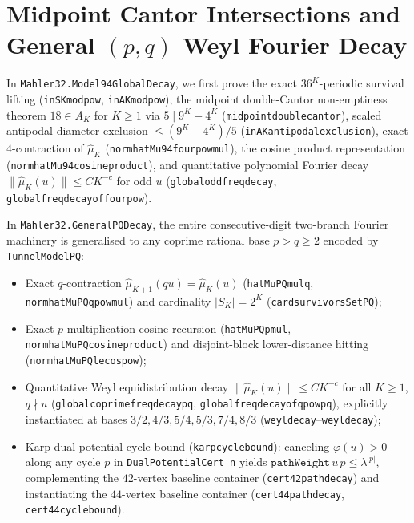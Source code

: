 \documentclass[11pt,a4paper]{article}
\theoremstyle{remark}
\renewcommand{\_}{\textunderscore\allowbreak}
\newcommand{\lean}[1]{\texttt{#1}}
\begin{document}
\section{Midpoint Cantor Intersections and General \texorpdfstring{$(p,q)$}{(p,q)} Weyl Fourier Decay}
\label{sec:pqdecay}

In \lean{Mahler32.\allowbreak Model94GlobalDecay}, we first prove the exact $36^K$-periodic survival lifting (\lean{inSK\_mod\_36\_pow}, \lean{inAK\_mod\_36\_pow}), the midpoint double-Cantor non-emptiness theorem $18\in A_K$ for $K\ge 1$ via $5\mid 9^K-4^K$ (\lean{midpoint\_double\_cantor}), scaled antipodal diameter exclusion $\le (9^K-4^K)/5$ (\lean{inAK\_antipodal\_exclusion}), exact $4$-contraction of $\hat\mu_K$ (\lean{norm\_hatMu94\_four\_pow\_mul}), the cosine product representation (\lean{norm\_hatMu94\_cosine\_product}), and quantitative polynomial Fourier decay $\|\hat\mu_K(u)\|\le C K^{-c}$ for odd $u$ (\lean{global\_odd\_freq\_decay}, \lean{global\_freq\_decay\_of\_four\_pow}).

In \lean{Mahler32.\allowbreak GeneralPQDecay}, the entire consecutive-digit two-branch Fourier machinery is generalised to any coprime rational base $p>q\ge 2$ encoded by \lean{TunnelModelPQ}:
\begin{itemize}[leftmargin=1.4em]
  \item Exact $q$-contraction $\hat\mu_{K+1}(q u)=\hat\mu_K(u)$ (\lean{hatMuPQ\_mul\_q}, \lean{norm\_hatMuPQ\_q\_pow\_mul}) and cardinality $|S_K|=2^K$ (\lean{card\_survivorsSetPQ});
  \item Exact $p$-multiplication cosine recursion (\lean{hatMuPQ\_p\_mul}, \lean{norm\_hatMuPQ\_cosine\_product}) and disjoint-block lower-distance hitting (\lean{norm\_hatMuPQ\_le\_cos\_pow});
  \item Quantitative Weyl equidistribution decay $\|\hat\mu_K(u)\|\le C K^{-c}$ for all $K\ge 1$, $q\nmid u$ (\lean{global\_coprime\_freq\_decay\_pq}, \lean{global\_freq\_decay\_of\_q\_pow\_pq}), explicitly instantiated at bases $3/2,4/3,5/4,5/3,7/4,8/3$ (\lean{weyl\_decay\_3\_2}--\lean{weyl\_decay\_8\_3});
  \item Karp dual-potential cycle bound (\lean{karp\_cycle\_bound}): canceling $\varphi(u)>0$ along any cycle $p$ in \lean{DualPotentialCert n} yields $\lean{pathWeight}\,u\,p\le \lambda^{|p|}$, complementing the $42$-vertex baseline container (\lean{cert42\_path\_decay}) and instantiating the $44$-vertex baseline container (\lean{cert44\_path\_decay}, \lean{cert44\_cycle\_bound}).
\end{itemize}
\end{document}
